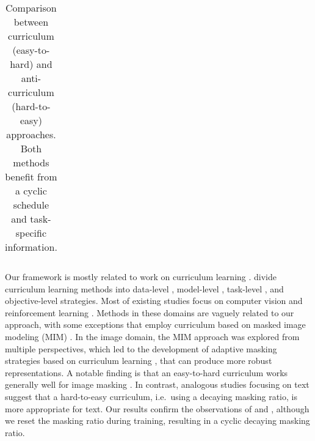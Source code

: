 \begin{table*}[t]
{\begin{tabular}{|c|c|c|c|c|c|c|}
    \hline
  \end{tabular}
  }
  \caption{\label{curriulum_vs_anticurriculum} Comparison between curriculum (easy-to-hard) and anti-curriculum (hard-to-easy) approaches. Both methods benefit from a cyclic schedule and task-specific information.}
\end{table*}
Our framework is mostly related to work on curriculum learning \cite{Bengio-ICML-2009}. \citet{Soviany-IJCV-2022} divide curriculum learning methods into data-level \cite{Chang-EACL-2021,Gong-CIKM-2021,Kocmi-RANLP-2017,Liu-IJCAI-2018,Nagatsuka-NGC-2023}, model-level \cite{Croitoru-IJCV-2025,Sinha-NeurIPS-2020}, task-level \cite{Liu-IJCAI-2020,Narvekar-AAMAS-2016}, and objective-level \cite{Pathak-ICMLA-2019} strategies. Most of existing studies focus on computer vision \cite{Croitoru-IJCV-2025,Huang-CVPR-2020,Sinha-NeurIPS-2020} and reinforcement learning \cite{Fang-NeurIPS-2019,Florensa-CoRL-2017}. Methods in these domains are vaguely related to our approach, with some exceptions that employ curriculum based on masked image modeling (MIM) \cite{Jarca-ECAI-2024,Madan-WACV-2024}. In the image domain, the MIM approach was explored from multiple perspectives, which led to the development of adaptive masking strategies based on curriculum learning \cite{Madan-WACV-2024}, that can produce more robust representations. A notable finding is that an easy-to-hard curriculum works generally well for image masking \cite{Jarca-ECAI-2024}. In contrast, analogous studies focusing on text \cite{Ankner-EACL-2024,Yang-ACL-2023} suggest that a hard-to-easy curriculum, i.e.~using a decaying masking ratio, is more appropriate for text. Our results confirm the observations of \citet{Ankner-EACL-2024} and \citet{Yang-ACL-2023}, although we reset the masking ratio during training, resulting in a cyclic decaying masking ratio.

